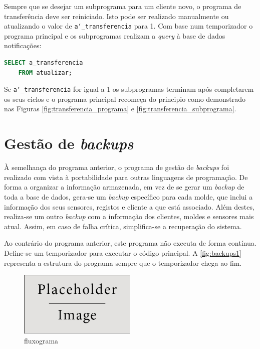 \documentclass[11pt,twoside,a4paper]{report}
\begin{document}
Sempre que se desejar um subprograma para um cliente novo, o programa de transferência deve ser reiniciado. Isto pode ser realizado manualmente ou atualizando o valor de \texttt{a\char`_transferencia} para 1. Com base num temporizador o programa principal e os subprogramas realizam a \textit{query} à base de dados notificações:
\begin{lstlisting}[language = SQL]
	SELECT a_transferencia
	FROM atualizar;
\end{lstlisting}
Se \texttt{a\char`_transferencia} for igual a 1 os subprogramas terminam após completarem os seus ciclos e o programa principal recomeça do principio como demonstrado nas Figuras \ref{fig:transferencia_programa} e \ref{fig:transferencia_subprograma}.

\section{Gestão de \textit{backups}}
\label{subchap:backups}
À semelhança do programa anterior, o programa de gestão de \textit{backups} foi realizado com vista à portabilidade para outras linguagens de programação. De forma a organizar a informação armazenada, em vez de se gerar um \textit{backup} de toda a base de dados, gera-se um \textit{backup} específico para cada molde, que inclui a informação dos seus sensores, registos e cliente a que está associado. Além destes, realiza-se um outro \textit{backup} com a informação dos clientes, moldes e sensores mais atual. Assim, em caso de falha crítica, simplifica-se a recuperação do sistema.\par 
Ao contrário do programa anterior, este programa não executa de forma contínua. Define-se um temporizador para executar o código principal. A \autoref{fig:backups1} representa a estrutura do programa sempre que o temporizador chega ao fim.
\begin{figure}[H]
	\begin{center}
		\includegraphics[width=0.5\textwidth]{placeholder} %
		\caption{fluxograma}
		\label{fig:backups1}
	\end{center}
\end{figure}
\end{document}

